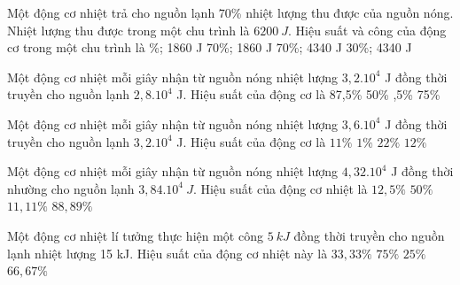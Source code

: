 
\begin{ex}%
	Một động cơ nhiệt trả cho nguồn lạnh $70$\% nhiệt lượng thu được của nguồn nóng. Nhiệt lượng thu được trong một chu trình là $6200\ J $. Hiệu suất và công của động cơ trong một chu trình là
	\choice
	{\%; 1860 J}
	{70\%; 1860 J}
	{70\%; 4340 J}
	{30\%; 4340 J}
	\end{ex}


\begin{ex}%
	Một động cơ nhiệt mỗi giây nhận từ nguồn nóng nhiệt lượng $3,2.10^4$ J đồng thời truyền cho nguồn lạnh $2,8.10^4$ J. Hiệu suất của động cơ là
	\choice
	{87,5\%}
	{50\%}
	{,5\%}
	{75\%}
	\end{ex}

\begin{ex}%
	Một động cơ nhiệt mỗi giây nhận từ nguồn nóng nhiệt lượng $3,6. 10^4$ J đồng thời truyền cho nguồn lạnh $3,2. 10^4$ J. Hiệu suất của động cơ là
	\choice
	{\True $11\%$}
	{$1\%$}
	{$22\%$}
	{$12\%$}
	\end{ex}

\begin{ex} 
	Một động cơ nhiệt mỗi giây nhận từ nguồn nóng nhiệt lượng $4,32.10^4$ J đồng thời nhường cho nguồn lạnh $3,84.10^4\ J$. Hiệu suất của động cơ nhiệt là 
	\choice
	{$12,5 \%$}
	{$50 \%$}
	{\True $11,11 \%$}
	{$88,89 \%$}
	\loigiai{
	}
\end{ex}


\begin{ex}
	Một động cơ nhiệt lí tưởng thực hiện một công $5 \ kJ$ đồng thời truyền cho nguồn lạnh nhiệt lượng 15 kJ. Hiệu suất của động cơ nhiệt này là
	\choice
	{$33,33 \%$}
	{$75 \%$}
	{\True $25 \%$}
	{$66,67 \%$}
	\end{ex}

